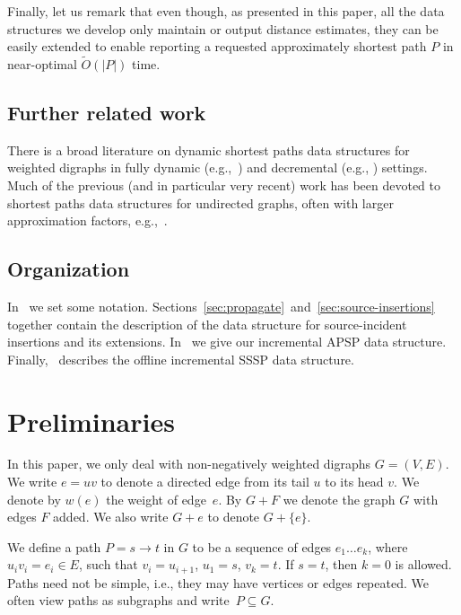 \documentclass[11pt,letterpaper]{article}
\theoremstyle{plain}
\renewcommand{\O}{O}
\newcommand{\Ot}{\ensuremath{\widetilde{\O}}}
\newcommand{\wei}{w}
\begin{document}
Finally, let us remark that even though, as presented in this paper, all the data structures we develop only maintain or output distance estimates, they can be easily extended to enable reporting a requested approximately shortest path $P$ in near-optimal $\Ot(|P|)$ time.

\subsection{Further related work}
There is a broad literature on dynamic shortest paths data structures for weighted digraphs in fully dynamic (e.g.,~\cite{AlokhinaB24, BrandN19, Bernstein16, ChechikZ23, DemetrescuI04, Mao24a}) and decremental (e.g., \cite{Bernstein16, BernsteinGS20, BernsteinGW20, KarczmarzL19}) settings.
Much of the previous (and in particular very recent) work has been devoted to shortest paths data structures for undirected graphs, often with larger approximation factors, e.g.,~\cite{Bernstein09, BernsteinGS21, Chechik18, DoryFNV24, ForsterGNS23, forsterNG23, HaeuplerLS24, KyngMG24}.

\subsection{Organization}
In~ we set some notation. Sections~\ref{sec:propagate}~and~\ref{sec:source-insertions} together contain the description of the data structure for source-incident insertions and its extensions.
In~ we give our incremental APSP data structure.
Finally,~ describes the offline incremental SSSP data structure.

\section{Preliminaries}\label{sec:prelims}
In this paper, we only deal with non-negatively weighted digraphs $G=(V,E)$.
We write $e=uv$ to denote a directed edge from its tail $u$ to its head $v$. We denote by $\wei(e)$ the weight of edge~$e$.
By $G+F$ we denote the graph $G$ with edges $F$ added.
We also write $G+e$ to denote $G+\{e\}$.

We define a path $P=s\to t$ in $G$ to be a sequence of edges $e_1\ldots e_k$, where $u_iv_i=e_i\in E$, such that $v_i=u_{i+1}$, $u_1=s$, $v_k=t$.
If $s=t$, then $k=0$ is allowed.
Paths need not be simple, i.e., they may have vertices or edges repeated.
We often view paths as subgraphs and write~$P\subseteq G$.
\end{document}
